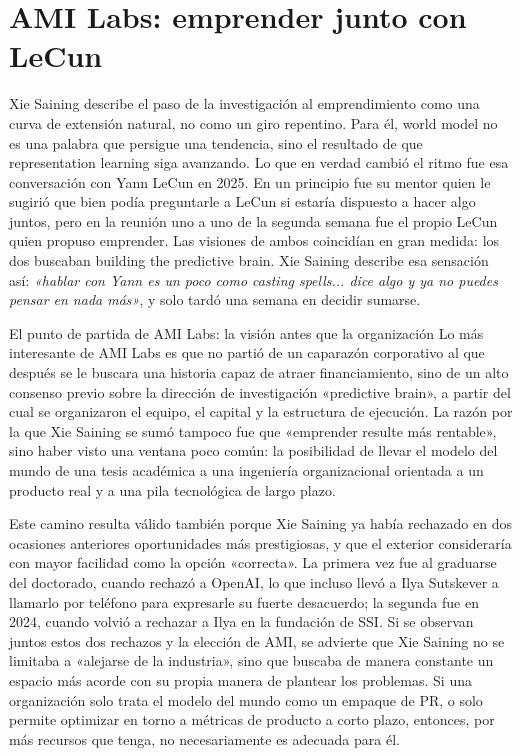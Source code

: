 \section{AMI Labs: emprender junto con LeCun}

Xie Saining describe el paso de la investigación al emprendimiento como una curva de extensión natural, no como un giro repentino. Para él, world model no es una palabra que persigue una tendencia, sino el resultado de que representation learning siga avanzando. Lo que en verdad cambió el ritmo fue esa conversación con Yann LeCun en 2025. En un principio fue su mentor quien le sugirió que bien podía preguntarle a LeCun si estaría dispuesto a hacer algo juntos, pero en la reunión uno a uno de la segunda semana fue el propio LeCun quien propuso emprender. Las visiones de ambos coincidían en gran medida: los dos buscaban building the predictive brain. Xie Saining describe esa sensación así: \textit{«hablar con Yann es un poco como casting spells... dice algo y ya no puedes pensar en nada más»}, y solo tardó una semana en decidir sumarse.

\begin{importantbox}{El punto de partida de AMI Labs: la visión antes que la organización}
Lo más interesante de AMI Labs es que no partió de un caparazón corporativo al que después se le buscara una historia capaz de atraer financiamiento, sino de un alto consenso previo sobre la dirección de investigación «predictive brain», a partir del cual se organizaron el equipo, el capital y la estructura de ejecución. La razón por la que Xie Saining se sumó tampoco fue que «emprender resulte más rentable», sino haber visto una ventana poco común: la posibilidad de llevar el modelo del mundo de una tesis académica a una ingeniería organizacional orientada a un producto real y a una pila tecnológica de largo plazo.
\end{importantbox}

Este camino resulta válido también porque Xie Saining ya había rechazado en dos ocasiones anteriores oportunidades más prestigiosas, y que el exterior consideraría con mayor facilidad como la opción «correcta». La primera vez fue al graduarse del doctorado, cuando rechazó a OpenAI, lo que incluso llevó a Ilya Sutskever a llamarlo por teléfono para expresarle su fuerte desacuerdo; la segunda fue en 2024, cuando volvió a rechazar a Ilya en la fundación de SSI. Si se observan juntos estos dos rechazos y la elección de AMI, se advierte que Xie Saining no se limitaba a «alejarse de la industria», sino que buscaba de manera constante un espacio más acorde con su propia manera de plantear los problemas. Si una organización solo trata el modelo del mundo como un empaque de PR, o solo permite optimizar en torno a métricas de producto a corto plazo, entonces, por más recursos que tenga, no necesariamente es adecuada para él.

